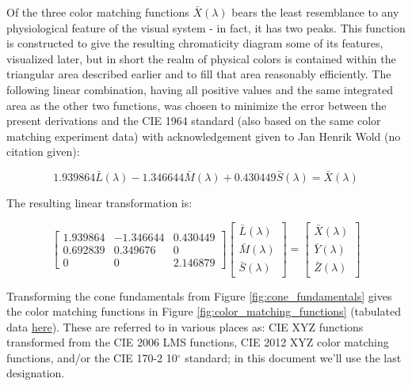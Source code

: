 \documentclass{article}
\begin{document}
\begin{multicols}{2}
Of the three color matching functions $\bar{X}(\lambda)$ bears the least resemblance to any physiological feature of the visual system - in fact, it has two peaks.  This function is constructed to give the resulting chromaticity diagram some of its features, visualized later, but in short the realm of physical colors is contained within the triangular area described earlier and to fill that area reasonably efficiently.  The following linear combination, having all positive values and the same integrated area as the other two functions, was chosen to minimize the error between the present derivations and the CIE 1964 standard (also based on the same color matching experiment data) with acknowledgement given to Jan Henrik Wold (no citation given):

\begin{equation} %
    1.939864\bar{L}(\lambda)-1.346644\bar{M}(\lambda)+0.430449\bar{S}(\lambda)=\bar{X}(\lambda)
\end{equation}

The resulting linear transformation is:

\begin{equation}\label{eq:lms_to_xyz_10} %
    \begin{bmatrix}
        1.939864&-1.346644&0.430449\\
        0.692839&0.349676&0\\
        0&0&2.146879
    \end{bmatrix}\begin{bmatrix}
        \bar{L}(\lambda)\\
        \bar{M}(\lambda)\\
        \bar{S}(\lambda)
    \end{bmatrix}=\begin{bmatrix}
        \bar{X}(\lambda)\\
        \bar{Y}(\lambda)\\
        \bar{Z}(\lambda)
    \end{bmatrix}
\end{equation}

Transforming the cone fundamentals from Figure \ref{fig:cone_fundamentals} gives the color matching functions in Figure \ref{fig:color_matching_functions} (tabulated data \href{http://www.cvrl.org/ciexyzpr.htm}{here}).  These are referred to in various places as: CIE XYZ functions transformed from the CIE 2006 LMS functions, CIE 2012 XYZ color matching functions, and/or the CIE 170-2 10$^\circ$ standard; in this document we'll use the last designation.


\end{multicols}
\end{document}
